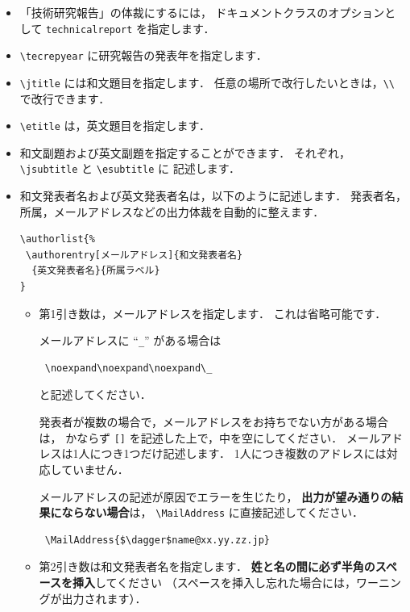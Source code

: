 \documentclass[technicalreport]{ieicej}
\begin{document}
\begin{itemize}
\item
「技術研究報告」の体裁にするには，
ドキュメントクラスのオプションとして
\texttt{technicalreport} を指定します．

\item
\verb/\tecrepyear/ に研究報告の発表年を指定します．

\item
\verb/\jtitle/ には和文題目を指定します．
任意の場所で改行したいときは，\verb/\\/ で改行できます．

\item
\verb/\etitle/ は，英文題目を指定します．

\item
和文副題および英文副題を指定することができます．
それぞれ，\verb/\jsubtitle/ と \verb/\esubtitle/ に
記述します．

\item
和文発表者名および英文発表者名は，以下のように記述します．
発表者名，所属，メールアドレスなどの出力体裁を自動的に整えます．
\begin{verbatim}
\authorlist{%
 \authorentry[メールアドレス]{和文発表者名}
  {英文発表者名}{所属ラベル}
}
\end{verbatim}

\begin{itemize}
\item
第1引き数は，メールアドレスを指定します．
これは省略可能です．

メールアドレスに ``\texttt{\_}'' がある場合は
\begin{verbatim}
 \noexpand\noexpand\noexpand\_
\end{verbatim}
と記述してください．

発表者が複数の場合で，メールアドレスをお持ちでない方がある場合は，
かならず \texttt{[]} を記述した上で，中を空にしてください．
メールアドレスは1人につき1つだけ記述します．
1人につき複数のアドレスには対応していません．

メールアドレスの記述が原因でエラーを生じたり，
{\bfseries 出力が望み通りの結果にならない場合}は，
\verb/\MailAddress/ に直接記述してください．
\begin{verbatim}
 \MailAddress{$\dagger$name@xx.yy.zz.jp}
\end{verbatim}

\item
第2引き数は和文発表者名を指定します．
{\bfseries 姓と名の間に必ず半角のスペースを挿入}してください
（スペースを挿入し忘れた場合には，ワーニングが出力されます）．


\end{itemize}
\end{itemize}
\end{document}

